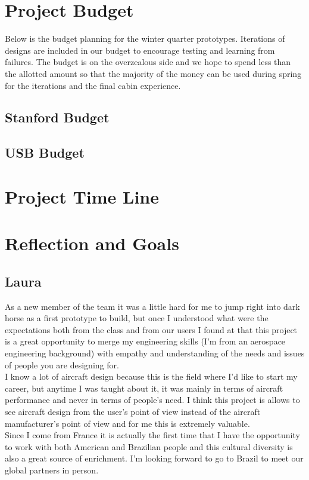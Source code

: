 \section{Project Budget}
Below is the budget planning for the winter quarter prototypes.  Iterations of designs are included in our budget to encourage testing and learning from failures. The budget is on the overzealous side and we hope to spend less than the allotted amount so that the majority of the money can be used during spring for the iterations and the final cabin experience.
\subsection{Stanford Budget}
\subsection{USB Budget}
 

\section{Project Time Line}
\section{Reflection and Goals}

\subsection{Laura}
As a new member of the team it was a little hard for me to jump right into dark horse as a first prototype to build, but once I understood what were the expectations both from the class and from our users I found at that this project is a great opportunity to merge my engineering skills (I’m from an aerospace engineering background) with empathy and understanding of the needs and issues of people you are designing for. \\

I know a lot of aircraft design because this is the field where I’d like to start my career, but anytime I was taught about it, it was mainly in terms of aircraft performance and never in terms of people’s need. I think this project is allows to see aircraft design from the user’s point of view instead of the aircraft manufacturer’s point of view and for me this is extremely valuable. \\

Since I come from France it is actually the first time that I have the opportunity to work with both American and Brazilian people and this cultural diversity is also a great source of enrichment. I’m looking forward to go to Brazil to meet our global partners in person. \\

